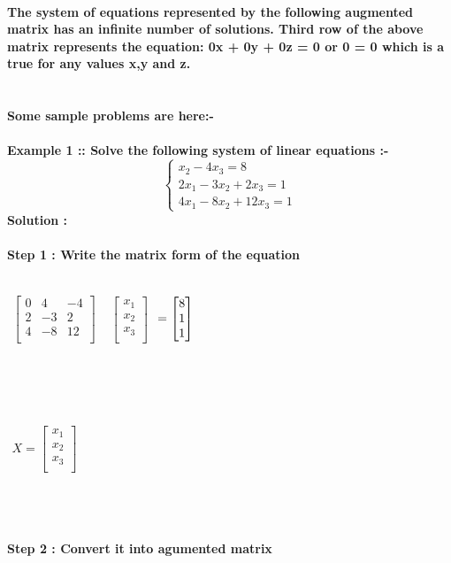 \documentclass[15pt]{article}
\begin{document}
  \\
\textbf{The system of equations represented by the following
augmented matrix has an infinite number of solutions. Third row of the above matrix represents
the equation: 0x + 0y + 0z = 0 or 0 = 0 which is a true for any values x,y and z.}\\
\\
\\
\textbf{Some sample problems are here:-}\\
\\
\textbf{Example 1 :: Solve the following system of linear equations :- }
\[
\left\{ 
\begin{array}{c}
x_2-4x_3=8 \\ 
2x_1-3x_2+2x_3=1 \\ 
4x_1-8x_2+12x_3=1
\end{array}
\right. 
\]
\textbf{Solution :}\\
\\
\hspace{1.5cm}
\textbf{Step 1 : Write the matrix form of the equation }\\
\\
\centerline{
$\begin{matrix}
\begin{bmatrix}
0 &  4 & -4\\
2 & -3 &  2\\
4 & -8 & 12\\
\end{bmatrix}
\end{matrix}$
$\begin{matrix}
\begin{bmatrix}
x_1\\
x_2\\
x_3\\
\end{bmatrix}
\end{matrix}$
$\begin{matrix}
\space = \space
\begin{bmatrix}
8\\
1\\
1\\
\end{bmatrix}
\end{matrix}$}
\\ 
\\ 
\\
\centerline{
$\begin{matrix}
X=
\begin{bmatrix}
x_1\\
x_2\\
x_3\\
\end{bmatrix}
\end{matrix}$}
\\
\\
\\
\textbf{Step 2 : Convert it into agumented matrix }\\
\\
\end{document}
